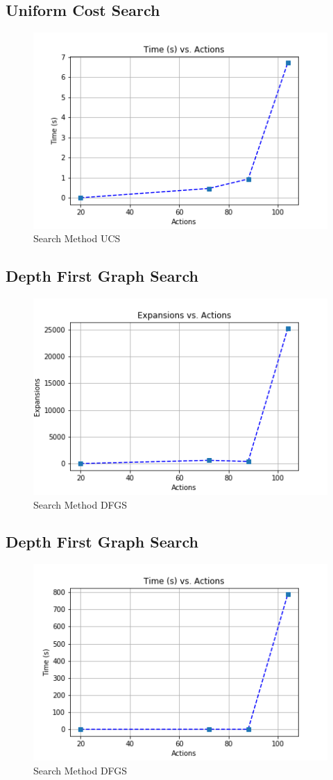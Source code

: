 \documentclass[a4paper]{article}
\begin{document}
\subsection{Uniform Cost Search}

\begin{figure}[htpb]
\begin{center}
\includegraphics[width=0.5\columnwidth]{fig/results_431.png}
\caption{Search Method UCS}
\end{center}
\label{fig431}
\end{figure}
        

\subsection{Depth First Graph Search}

\begin{figure}[htpb]
\begin{center}
\includegraphics[width=0.5\columnwidth]{fig/results_534.png}
\caption{Search Method DFGS}
\end{center}
\label{fig534}
\end{figure}
        

\subsection{Depth First Graph Search}

\begin{figure}[htpb]
\begin{center}
\includegraphics[width=0.5\columnwidth]{fig/results_531.png}
\caption{Search Method DFGS}
\end{center}
\label{fig531}
\end{figure}
        
\end{document}
